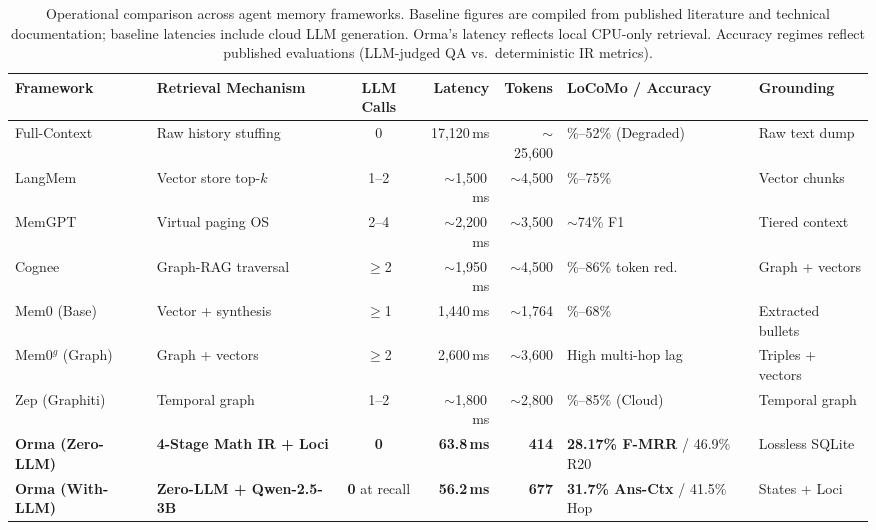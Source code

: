 \documentclass[11pt]{article}
\newcommand{\orma}{\mbox{Orma}}
\begin{document}
\begin{table}[t]
\centering
\scriptsize
\setlength{\tabcolsep}{2.5pt}
\renewcommand{\arraystretch}{1.18}
\begin{tabularx}{\linewidth}{@{}l >{\raggedright\arraybackslash}X c r r >{\raggedright\arraybackslash}p{2.3cm} >{\raggedright\arraybackslash}p{2.0cm}@{}}
\toprule
\textbf{Framework} & \textbf{Retrieval Mechanism} & \textbf{LLM Calls} & \textbf{Latency} & \textbf{Tokens} & \textbf{LoCoMo / Accuracy} & \textbf{Grounding}\\
\midrule
Full-Context & Raw history stuffing & 0 & 17,120\,ms & $\sim$25,600 & 40\%--52\% (Degraded) & Raw text dump\\
LangMem~\cite{langmem} & Vector store top-$k$ & 1--2 & $\sim$1,500\,ms & $\sim$4,500 & 70\%--75\% & Vector chunks\\
MemGPT~\cite{packer2023memgpt} & Virtual paging OS & 2--4 & $\sim$2,200\,ms & $\sim$3,500 & $\sim$74\% F1 & Tiered context\\
Cognee~\cite{cognee} & Graph-RAG traversal & $\geq$2 & $\sim$1,950\,ms & $\sim$4,500 & 73\%--86\% token red. & Graph + vectors\\
Mem0 (Base)~\cite{chhikara2025mem0} & Vector + synthesis & $\geq$1 & 1,440\,ms & $\sim$1,764 & 62\%--68\% & Extracted bullets\\
Mem0$^{g}$ (Graph)~\cite{chhikara2025mem0} & Graph + vectors & $\geq$2 & 2,600\,ms & $\sim$3,600 & High multi-hop lag & Triples + vectors\\
Zep (Graphiti)~\cite{rasmussen2025zep} & Temporal graph & 1--2 & $\sim$1,800\,ms & $\sim$2,800 & 78\%--85\% (Cloud) & Temporal graph\\
\midrule
\textbf{\orma{} (Zero-LLM)} & \textbf{4-Stage Math IR + Loci} & \textbf{0} & \textbf{63.8\,ms} & \textbf{414} & \textbf{28.17\% F-MRR} / 46.9\% R20 & Lossless SQLite\\
\textbf{\orma{} (With-LLM)} & \textbf{Zero-LLM + Qwen-2.5-3B} & \textbf{0} at recall & \textbf{56.2\,ms} & \textbf{677} & \textbf{31.7\% Ans-Ctx} / 41.5\% Hop & States + Loci\\
\bottomrule
\end{tabularx}
\caption{Operational comparison across agent memory frameworks. Baseline figures are compiled from published literature and technical documentation; baseline latencies include cloud LLM generation. \orma's latency reflects local CPU-only retrieval. Accuracy regimes reflect published evaluations (LLM-judged QA vs.\ deterministic IR metrics).}
\label{tab:landscape}
\end{table}
\end{document}
